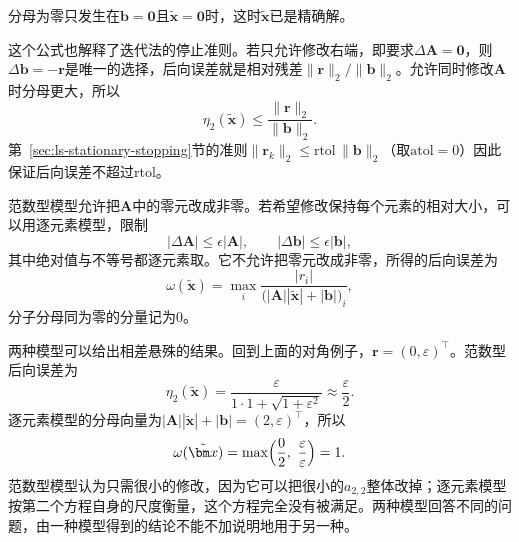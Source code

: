 分母为零只发生在$\bm b=\bm0$且$\tilde{\bm x}=\bm0$时，这时$\tilde{\bm x}$已是精确解。

这个公式也解释了迭代法的停止准则。若只允许修改右端，即要求$\Delta\bm A=\bm0$，则$\Delta\bm b=-\bm r$是唯一的选择，后向误差就是相对残差$\lVert\bm r\rVert_2/\lVert\bm b\rVert_2$。允许同时修改$\bm A$时分母更大，所以
\begin{equation}
 \eta_2(\tilde{\bm x})\leq\frac{\lVert\bm r\rVert_2}{\lVert\bm b\rVert_2}.
 \label{eq:ls-backward-error-relative-residual}
\end{equation}
第~\ref{sec:ls-stationary-stopping}节的准则$\lVert\bm r_k\rVert_2\leq\mathrm{rtol}\,\lVert\bm b\rVert_2$（取$\mathrm{atol}=0$）因此保证后向误差不超过$\mathrm{rtol}$。

范数型模型允许把$\bm A$中的零元改成非零。若希望修改保持每个元素的相对大小，可以用逐元素模型，限制
\begin{equation}
 |\Delta\bm A|\leq\epsilon|\bm A|,\qquad |\Delta\bm b|\leq\epsilon|\bm b|,
 \label{eq:ls-componentwise-backward-model}
\end{equation}
其中绝对值与不等号都逐元素取。它不允许把零元改成非零，所得的后向误差为
\begin{equation}
 \omega(\tilde{\bm x})=\max_i\frac{|r_i|}{\bigl(|\bm A||\tilde{\bm x}|+|\bm b|\bigr)_i},
 \label{eq:ls-componentwise-backward-error}
\end{equation}
分子分母同为零的分量记为$0$。

两种模型可以给出相差悬殊的结果。回到上面的对角例子，$\bm r=(0,\varepsilon)^\top$。范数型后向误差为
\[
 \eta_2(\tilde{\bm x})=\frac{\varepsilon}{1\cdot1+\sqrt{1+\varepsilon^2}}\approx\frac\varepsilon2 .
\]
逐元素模型的分母向量为$|\bm A||\tilde{\bm x}|+|\bm b|=(2,\varepsilon)^\top$，所以
\[
 \omega(\tilde{\bm x})=\max\Bigl(\frac02,\ \frac\varepsilon\varepsilon\Bigr)=1 .
\]
范数型模型认为只需很小的修改，因为它可以把很小的$a_{2,2}$整体改掉；逐元素模型按第二个方程自身的尺度衡量，这个方程完全没有被满足。两种模型回答不同的问题，由一种模型得到的结论不能不加说明地用于另一种。

